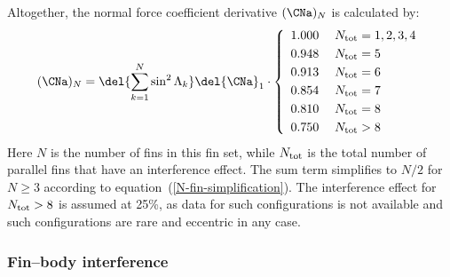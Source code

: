 \pagebreak[4]
Altogether, the normal force coefficient derivative $(\CNa)_N$ is
calculated by:
%
\begin{equation}
(\CNa)_N = \del{\sum_{k=1}^N \sin^2\Lambda_k} \del{\CNa}_1 \cdot
  \left\{ 
\begin{array}{ll}
  1.000\; & N_{\rm tot}=1,2,3,4  \vspace{1mm}\\
  0.948\; & N_{\rm tot}=5  \vspace{1mm}\\
  0.913\; & N_{\rm tot}=6  \vspace{1mm}\\
  0.854\; & N_{\rm tot}=7  \vspace{1mm}\\
  0.810\; & N_{\rm tot}=8  \vspace{1mm}\\
  0.750\; & N_{\rm tot}>8
\end{array}
  \right.
\end{equation}
%
%
Here $N$ is the number of fins in this fin set, while $N_{\rm tot}$ is
the total number of parallel fins that have an interference effect.
The sum term simplifies to $N/2$ for $N\geq3$ according to
equation~(\ref{N-fin-simplification}).  The interference effect for
$N_{\rm tot}>8$ is assumed at 25\%, as data for such configurations is
not available and such configurations are rare and eccentric in any
case.

\subsubsection{Fin--body interference}


